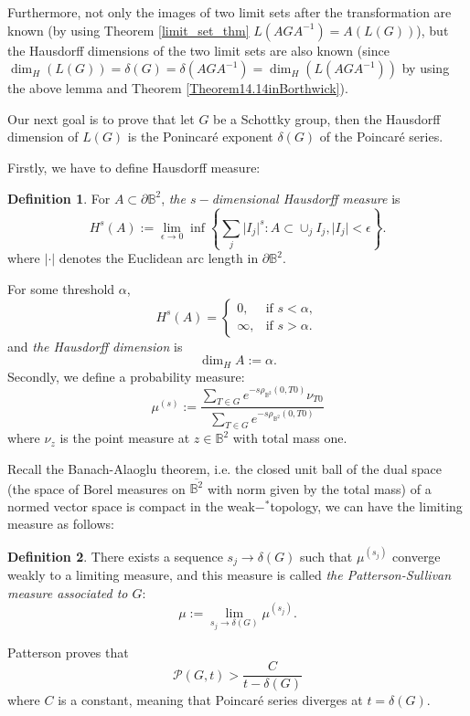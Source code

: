 \documentclass[12pt,oneside]{sfsuthesis}
\theoremstyle{plain} %
\theoremstyle{definition}  %
\newtheorem{definition}{Definition}[chapter]
\theoremstyle{remark}  %
\theoremstyle{plain}
\begin{document}
{Furthermore, not only the images of two limit sets after the transformation are known (by using Theorem \ref{limit_set_thm} $L(AGA^{-1})=A(L(G))$), but the Hausdorff dimensions of the two limit sets are also known (since $\dim_H\left( L(G) \right)=\delta(G)=\delta(AGA^{-1})=\dim_H \left(L(AGA^{-1})\right)$ by using the above lemma and Theorem \ref{Theorem14.14inBorthwick}). 

Our next goal is to prove that let $G$ be a Schottky group, then the Hausdorff dimension of $L(G)$ is the Ponincar\'{e} exponent $\delta(G)$ of the Poincar\'{e} series.

Firstly, we have to define Hausdorff measure:

\begin{definition}
For $A\subset \partial\mathbb{B}^2$, \textit{the $s-$dimensional Hausdorff measure} is 
$$
H^s\left(A\right):=\lim\limits_{\epsilon\to 0}\inf\left\lbrace \sum\limits_{j}\vert I_j\vert^s:A\subset \cup_j I_j,\vert I_j\vert<\epsilon \right\rbrace.
$$
where $\vert \cdot\vert $ denotes the Euclidean arc length in $\partial\mathbb{B}^2$.
\end{definition}
For some threshold $\alpha$,
$$
H^s\left(A\right)=\begin{cases} 
      0, & \text{if } s<\alpha, \\
      \infty, &\text{if } s>\alpha. 
   \end{cases}
$$
and \textit{the Hausdorff dimension} is 
$$
\dim_{H}A:=\alpha.
$$
Secondly, we define a probability measure:
$$
\mu^{(s)}:=\frac{\sum\limits_{T\in G}e^{-s\rho_{\mathbb{B}^2}(0,T0)}\nu_{T0}}{\sum\limits_{T\in G}e^{-s\rho_{\mathbb{B}^2}(0,T0)}}
$$
where $\nu_z$ is the point measure at $z\in\mathbb{B}^2$ with total mass one.

Recall the Banach-Alaoglu theorem, i.e. the closed unit ball of the dual space (the space of Borel measures on $\overline{\mathbb{B}^2}$ with norm given by the total mass) of a normed vector space is compact in the weak$-^{\ast}$topology, we can have the limiting measure as follows:
\begin{definition}
There exists a sequence $s_j\to \delta(G)$ such that $\mu^{(s_j)}$ converge weakly to a limiting measure, and this measure is called \textit{the Patterson-Sullivan measure associated to $G$}:
$$
\mu:=\lim\limits_{s_j\to\delta(G)}\mu^{(s_j)}.
$$
\end{definition}
Patterson\cite{patterson1976limit} proves that 
$$
\mathcal{P}(G,t)>\frac{C}{t-\delta(G)}
$$
where $C$ is a constant, meaning that Poincar\'{e} series diverges at $t=\delta(G)$.


}
\end{document}

